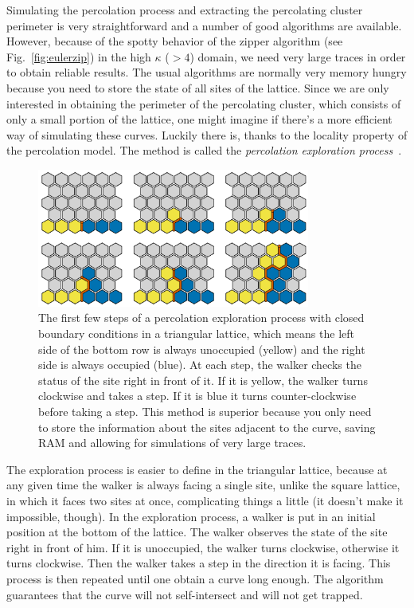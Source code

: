 Simulating the percolation process and extracting the percolating cluster
perimeter is very straightforward and a number of good algorithms are
available. However, because of the spotty behavior of the zipper algorithm (see
Fig.~\ref{fig:eulerzip}) in the high $\kappa$ ($>4$) domain, we need very large
traces in order to obtain reliable results. The usual algorithms are normally
very memory hungry because you need to store the state of all sites of the
lattice. Since we are only interested in obtaining the perimeter of the
percolating cluster, which consists of only a small portion of the lattice, one
might imagine if there's a more efficient way of simulating these curves.
Luckily there is, thanks to the locality property of the percolation model. The
method is called the \textit{percolation exploration process}~\cite{Cardy2005}.

\begin{figure}[b]
\begin{center}
    \includegraphics[width=0.8\textwidth]{chapters/ch6-asle/figs/explore}
\end{center}
\caption{The first few steps of a percolation exploration process with closed
    boundary conditions in a triangular lattice, which means the left side of
    the bottom row is always unoccupied (yellow) and the right side is always
    occupied (blue). At each step, the walker checks the status of the site
    right in front of it. If it is yellow, the walker turns clockwise and takes
    a step. If it is blue it turns counter-clockwise before taking a step. This
    method is superior because you only need to store the information about the
    sites adjacent to the curve, saving RAM and allowing for simulations of
    very large traces.}
\label{fig:explore}
\end{figure}


The exploration process is easier to define in the triangular lattice, because
at any given time the walker is always facing a single site, unlike the square
lattice, in which it faces two sites at once, complicating things a little (it
doesn't make it impossible, though). In the exploration process, a walker is
put in an initial position at the bottom of the lattice. The walker observes
the state of the site right in front of him. If it is unoccupied, the walker
turns clockwise, otherwise it turns clockwise. Then the walker takes a step in
the direction it is facing. This process is then repeated until one obtain a
curve long enough. The algorithm guarantees that the curve will not
self-intersect and will not get trapped.

